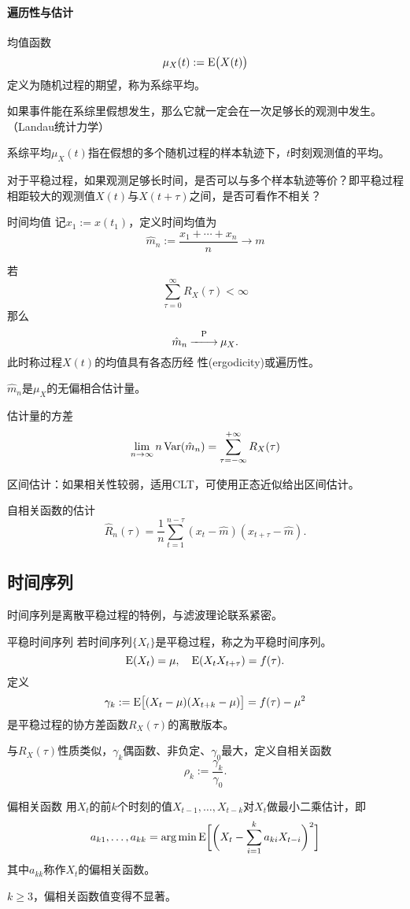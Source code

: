 \paragraph{遍历性与估计}
均值函数
\[
	\mu_X(t):=\operatorname{E}\bigl(X(t)\bigr)
\]
定义为随机过程的期望，称为系综平均。
\begin{compactitem}
	\item 如果事件能在系综里假想发生，那么它就一定会在一次足够长的观测中发生。（Landau统计力学）
	\item 系综平均$\mu_X(t)$指在假想的多个随机过程的样本轨迹下，$t $时刻观测值的平均。
	\item 对于平稳过程，如果观测足够长时间，是否可以与多个样本轨迹等价？即平稳过程相距较大的观测值$ X(t) $与$ X(t + \tau) $之间，是否可看作不相关？
\end{compactitem}
\begin{definition}{时间均值}{}
	记$x_1:=x(t_1)$，定义时间均值为
	\[
		\hat m_n:=\frac{x_1+\cdots+x_n}n\to m
	\]
\end{definition}
若
\[
	\sum_{\tau=0}^\infty R_X(\tau)<\infty
\]
那么
\[
	\hat m_n\overset{\operatorname{P}}{-\hspace{-4 pt}-\hspace{-5 pt}\longrightarrow}\mu_X.
\]
此时称过程$ X(t) $的均值具有各态历经
性(ergodicity)或遍历性。
\begin{compactitem}
	\item $\hat m_n$是$\mu_X$的无偏相合估计量。
	\item 估计量的方差\[
		\lim_{n\to\infty}n\operatorname{Var}(\hat m_n)=\sum_{\tau=-\infty}^{+\infty}R_X(\tau)
	\]
\end{compactitem}
区间估计：如果相关性较弱，适用CLT，可使用正态近似给出区间估计。

自相关函数的估计
\[
	\hat R_n(\tau)=\frac1n\sum_{t=1}^{n-\tau}(x_t-\hat m)(x_{t+\tau}-\hat m).
\]
\subsection{时间序列}
时间序列是离散平稳过程的特例，与滤波理论联系紧密。
\begin{definition}{平稳时间序列}{}
	若时间序列$\{X_t\}$是平稳过程，称之为平稳时间序列。
	\[
		\operatorname{E}(X_t)=\mu,\quad\operatorname{E}(X_tX_{t+\tau})=f(\tau).
	\]
	定义
	\[
		\gamma_k:=\operatorname{E}\bigl[(X_t-\mu)(X_{t+k}-\mu)\bigr]=f(\tau)-\mu^2
	\]
	是平稳过程的协方差函数$R_X(\tau)$的离散版本。
\end{definition}
与$R_X(\tau)$性质类似，$\gamma_k$偶函数、非负定、$\gamma_0$最大，定义自相关函数
\[
	\rho_k:=\frac{\gamma_k}{\gamma_0}.
\]
\begin{definition}{偏相关函数}{}
	用$X_t$的前$ k $个时刻的值$X_{t-1},\ldots,X_{t-k}$对$ X_t $做最小二乘估计，即
	\[
		a_{k1},\ldots,a_{kk}=\arg\min\operatorname{E}\biggl[\biggl(X_t-\sum_{i=1}^ka_{ki}X_{t-i}\biggr)^2\biggr]
	\]
	其中$a_{kk}$称作$X_t$的偏相关函数。
\end{definition}
$k\geqslant 3$，偏相关函数值变得不显著。
